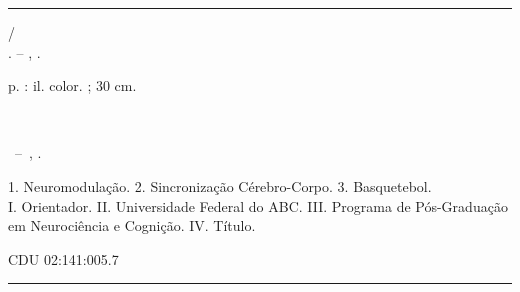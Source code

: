 %
%     
%

\begin{fichacatalografica}
    \vspace*{\fill}
    \hrule
    \begin{center}
    \begin{minipage}[c]{12cm} %

    \imprimirautor

    \hspace{0.5cm} \imprimirtitulo /\\
    \hspace{0.5cm} \imprimirautor. -- \imprimirlocal, \imprimirdata.

    \hspace{0.5cm} \pageref{LastPage} p. : il. color. ; 30 cm.

    \hspace{0.5cm} \imprimirorientadorRotulo~\imprimirorientador

    \hspace{0.5cm}
    \parbox[t]{0.9\textwidth}{%
      \imprimirtipotrabalho~--~\imprimirinstituicao,
      \imprimirdata.
    }

    \hspace{0.5cm}
    1. Neuromodulação. 2. Sincronização Cérebro-Corpo. 3. Basquetebol.\\
    I. Orientador. II. Universidade Federal do ABC. III. Programa de Pós-Graduação em Neurociência e Cognição. IV. Título.

    \hspace{8.75cm} CDU 02:141:005.7

    \end{minipage}
    \end{center}
    \hrule
\end{fichacatalografica}